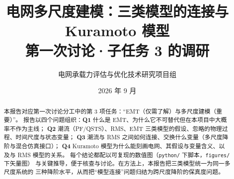 \documentclass[12pt,a4paper]{ctexart}
\title{\bfseries 电网多尺度建模：三类模型的连接与 Kuramoto 模型\\[4pt]
\large 第一次讨论·子任务 3 的调研}
\author{电网承载力评估与优化技术研究项目组}
\date{2026 年 9 月}
\begin{document}
\maketitle

\begin{abstract}
本报告对应第一次讨论分工中的第 3 项任务：“EMT（仅需了解）与多尺度建模（重要）”。
报告以四个问题组织：\textbf{Q1} 什么是 EMT、为什么它不可替代但在本项目中大概率不作为主线；
\textbf{Q2} 潮流（PF/QSTS）、RMS、EMT 三类模型的假设、忽略的物理过程、时间尺度与状态变量；
\textbf{Q3} 潮流与 RMS 之间如何连接、交换什么变量（多尺度降阶与混合仿真接口）；
\textbf{Q4} Kuramoto 模型为什么能刻画电网、其假设与变量含义、以及与 RMS 模型的关系。
每个结论都配以可复现的数值图（\texttt{python/} 下脚本，\texttt{figures/} 下矢量图）
与关键推导，便于核查与讨论。在方法上，本报告把三类模型统一为同一多尺度系统的
三种降阶水平，从而把“模型连接”问题归结为跨尺度降阶的保真度问题。
\end{abstract}

\tableofcontents
\vspace{1em}










\small


\end{document}
